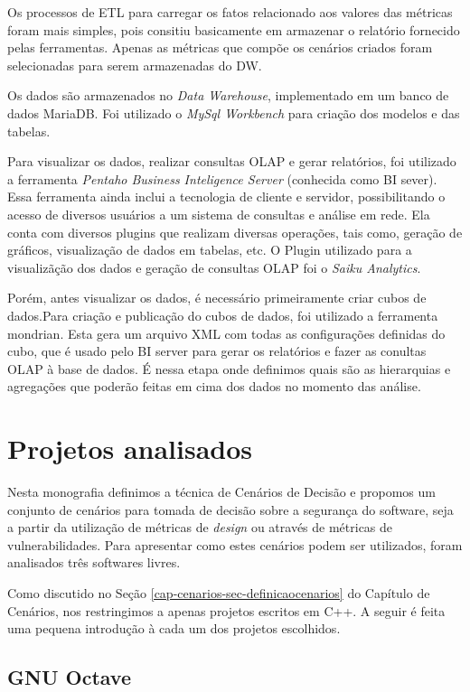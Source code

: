 Os processos de ETL para carregar os fatos relacionado aos valores das métricas foram mais simples, pois consitiu basicamente em armazenar o relatório fornecido pelas ferramentas. Apenas as métricas que compõe os cenários criados foram selecionadas para serem armazenadas do DW.


Os dados são armazenados no \emph{Data Warehouse}, implementado em um banco de dados MariaDB. Foi utilizado o \emph{MySql Workbench} para criação dos modelos e das tabelas.


Para visualizar os dados, realizar consultas OLAP e gerar relatórios, foi utilizado a ferramenta \emph{Pentaho Business Inteligence Server} (conhecida como BI sever). Essa ferramenta ainda inclui a tecnologia de cliente e servidor, possibilitando o acesso de diversos usuários a um sistema de consultas e análise em rede. Ela conta com diversos plugins que realizam diversas operações, tais como, geração de gráficos, visualização de dados em tabelas, etc. O Plugin utilizado para a visualizãção dos dados e geração de consultas OLAP foi o \emph{Saiku Analytics}.

Porém, antes visualizar os dados, é necessário primeiramente criar cubos de dados.Para criação e publicação do cubos de dados, foi utilizado a ferramenta mondrian. Esta gera um arquivo XML com todas as configurações definidas do cubo, que é usado pelo BI server para gerar os relatórios e fazer as conultas OLAP à base de dados. É nessa etapa onde definimos quais são as hierarquias e agregações que poderão feitas em cima dos dados no momento das análise.



\section{Projetos analisados}
\label{cap-projects}

Nesta monografia definimos a técnica de Cenários de Decisão e propomos um conjunto de cenários para tomada de decisão sobre a segurança do software, seja a partir da utilização de métricas de \emph{design} ou através de métricas de vulnerabilidades. Para apresentar como estes cenários podem ser utilizados, foram analisados três softwares livres. 

Como discutido no Seção \ref{cap-cenarios-sec-definicaocenarios} do Capítulo de Cenários, nos restringimos a apenas projetos escritos em C++. A seguir é feita uma pequena introdução à cada um dos projetos escolhidos.

\subsection{GNU Octave}
\label{section-octave}

